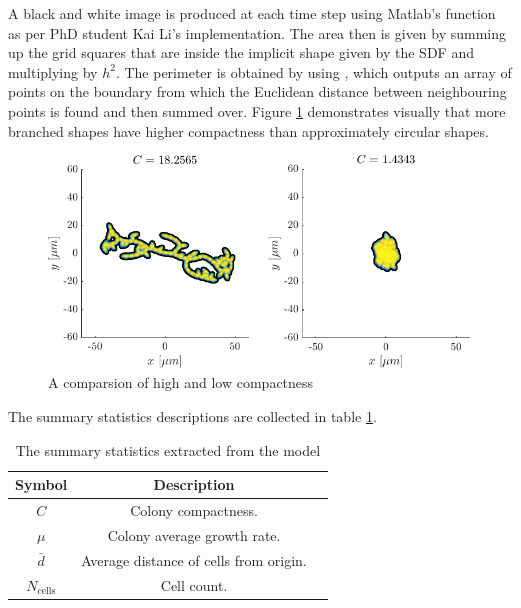 A black and white image 
is produced at each time step using Matlab's function  as per
PhD student Kai Li's implementation. The area then is given by summing up the grid squares that are
inside the implicit shape given by the SDF and multiplying by $h^2$. The perimeter
is obtained by using , which outputs an array of points on the boundary
from which the Euclidean distance between neighbouring points is found and then summed over.
Figure \ref{fig:compactness_comparison} demonstrates visually that more branched shapes 
have higher compactness than approximately circular shapes.
\begin{figure}[!htb]
    \centering
    \includegraphics[width=\textwidth]{chapter1/figures/compareCompactness.pdf}
    \caption{A comparsion of high and low compactness}
    \label{fig:compactness_comparison}
\end{figure}
The summary statistics descriptions are collected in table \ref{table:summaryStats}.
\begin{table}[!htb]
\begin{center}
    \begin{tabular}{ |c|c|c| } 
     \hline
      \textbf{Symbol} & \textbf{Description} \\ 
      \hline
     $C$                 &  Colony compactness. \\ 
     $\mu$               & Colony average growth rate. \\ 
     $\bar{d}$           &   Average distance of cells from origin. \\ 
     $N_{\textrm{cells}}$ & Cell count. \\
     \hline   
    \end{tabular}   
\end{center}
\caption{The summary statistics extracted from the model}
\label{table:summaryStats}
\end{table}













